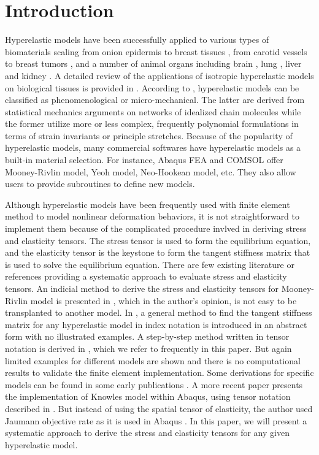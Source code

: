 \section{Introduction}
Hyperelastic models have been successfully applied to various types of biomaterials scaling from onion epidermis \cite{Qian} to breast tissues \cite{OHagen}, from carotid vessels \cite{Zidi, Zidi2, Bols} to breast tumors \cite{Oberai}, and a number of animal organs including brain \cite{Karimi, Samani, Gilchrist}, lung  \cite{Wall, Wall2}, liver and kidney \cite{Fu, Untaroiu, Willinger}. A detailed review of the applications of isotropic hyperelastic models on biological tissues is provided in \cite{Kupriyanova}.
According to \cite{Steinmann}, hyperelastic models can be classified as phenomenological or micro-mechanical. The latter are derived from statistical mechanics arguments on networks of idealized chain molecules while the former utilize more or less complex, frequently polynomial formulations in terms of strain invariants or principle stretches. Because of the popularity of hyperelastic models, many commercial softwares have hyperelastic models as a built-in material selection. For instance, Abaqus FEA and COMSOL offer Mooney-Rivlin model, Yeoh model, Neo-Hookean model, etc. They also allow users to provide subroutines to define new models.

Although hyperelastic models have been frequently used with finite element method to model nonlinear deformation behaviors, it is not straightforward to implement them because of the complicated procedure invlved in deriving stress and elasticity tensors. The stress tensor is used to form the equilibrium equation, and the elasticity tensor is the keystone to form the tangent stiffness matrix that is used to solve the equilibrium equation. There are few existing literature or references providing a systematic approach to evaluate stress and elasticity tensors. An indicial method to derive the stress and elasticity tensors for Mooney-Rivlin model is presented in \cite{Bower}, which in the author's opinion, is not easy to be transplanted to another model. In \cite{Belytschko}, a general method to find the tangent stiffness matrix for any hyperelastic model in index notation is introduced in an abstract form with no illustrated examples. A step-by-step method written in tensor notation is derived in \cite{Holzapfel}, which we refer to frequently in this paper. But again limited examples for different models are shown and there is no computational results to validate the finite element implementation. Some derivations for specific models can be found in some early publications \cite{Weiss, Nicholson}. A more recent paper \cite{Suchocki} presents the implementation of Knowles model within Abaqus, using tensor notation described in \cite{Holzapfel}. But instead of using the spatial tensor of elasticity, the author used Jaumann objective rate as it is used in Abaqus \cite{Abaqus}. In this paper, we will present a systematic approach to derive the stress and elasticity tensors for any given hyperelastic model.


